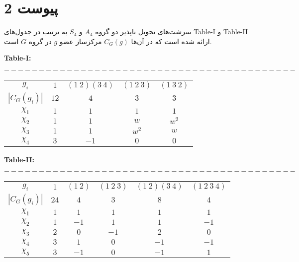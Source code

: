 \chapter*{پیوست‌ 2}
\thispagestyle{empty}

  سرشت‌های تحویل ناپذیر دو گروه  $A_4$ و  $S_4$ به ترتیب در جدول‌های  Table-I  و Table-II ارائه شده است که در آن‌ها $C_G(g)$ مرکزساز عضو $g$ در گروه $G$ است. 
\label{p1}

\begin{latin}
\noindent \bf Table-I: 
\end{latin}
$------------------------------------------$
\begin{latin}
\begin{center} 
\begin{tabular}{c|cccc} 
\hline
$g_i$             &  $1$     &  $(1~2)(3~4)$   &  $(1~2~3)$   &   $(1~3~2)$  \\
$|C_G(g_i)|$   &  $12$   &   $4$                 &  $3$              &  $3$             \\
\hline 
$\chi_1$         &  $1$     &  $1$   &  $1$      &    $1$        \\
$\chi_2$         &  $1$     &  $1$   &  $w$      &  $w^2$     \\
$\chi_3$         &  $1$     &  $1$   &  $w^2$  &   $w$        \\
$\chi_4$         &  $3$     &  $-1$  &  $0$       &  $0$         \\

\hline
\end{tabular}
\end{center}
\end{latin}

\begin{latin}
\noindent \bf Table-II:
\end{latin}
$------------------------------------------$
\begin{latin}
\begin{center} 
\begin{tabular}{c|ccccc} 
\hline
$g_i$              &  $1$     &   $(1~2)$    & $(1~2~3)$    &    $(1~2)(3~4)$    &   $(1~2~3~4)$  \\
$|C_G(g_i)|$   &  $24$   &   $4$           &  $3$              &           $8$            &  $4$         \\
\hline 
$\chi_1$         &  $1$     &  $1$   &  $1$      &  $1$     &   $1$   \\
$\chi_2$         &  $1$     &  $-1$  &  $1$      &  $1$     &   $-1$     \\
$\chi_3$         &  $2$     &  $0$   &  $-1$     &  $2$     &   $0$       \\
$\chi_4$         &  $3$     &  $1$   &  $0$      &  $-1$    &   $-1$          \\
$\chi_5$         &  $3$     &  $-1$  &  $0$      &  $-1$    &   $1$        \\
\hline
\end{tabular}
\end{center}
\end{latin}